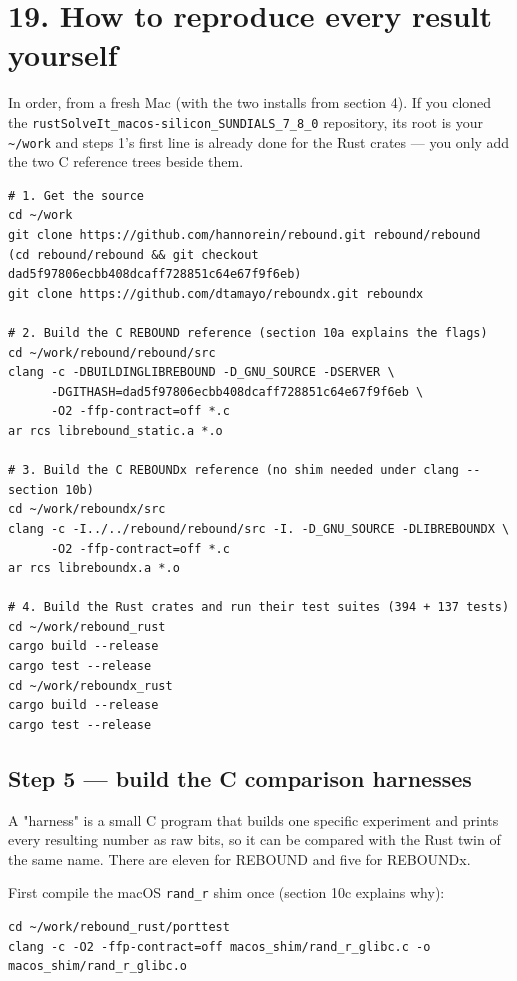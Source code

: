 \documentclass[11pt]{article}
\begin{document}
\section{19. How to reproduce every result yourself}

In order, from a fresh Mac (with the two installs from section 4). If you cloned the \texttt{rustSolveIt\_macos-silicon\_SUNDIALS\_7\_8\_0} repository, its root is your \texttt{\textasciitilde{}/work} and steps 1's first line is already done for the Rust crates --- you only add the two C reference trees beside them.

\begin{lstlisting}
# 1. Get the source
cd ~/work
git clone https://github.com/hannorein/rebound.git rebound/rebound
(cd rebound/rebound && git checkout dad5f97806ecbb408dcaff728851c64e67f9f6eb)
git clone https://github.com/dtamayo/reboundx.git reboundx

# 2. Build the C REBOUND reference (section 10a explains the flags)
cd ~/work/rebound/rebound/src
clang -c -DBUILDINGLIBREBOUND -D_GNU_SOURCE -DSERVER \
      -DGITHASH=dad5f97806ecbb408dcaff728851c64e67f9f6eb \
      -O2 -ffp-contract=off *.c
ar rcs librebound_static.a *.o

# 3. Build the C REBOUNDx reference (no shim needed under clang -- section 10b)
cd ~/work/reboundx/src
clang -c -I../../rebound/rebound/src -I. -D_GNU_SOURCE -DLIBREBOUNDX \
      -O2 -ffp-contract=off *.c
ar rcs libreboundx.a *.o

# 4. Build the Rust crates and run their test suites (394 + 137 tests)
cd ~/work/rebound_rust
cargo build --release
cargo test --release
cd ~/work/reboundx_rust
cargo build --release
cargo test --release
\end{lstlisting}

\subsection{Step 5 --- build the C comparison harnesses}

A "harness" is a small C program that builds one specific experiment and prints every resulting number as raw bits, so it can be compared with the Rust twin of the same name. There are eleven for REBOUND and five for REBOUNDx.

First compile the macOS \texttt{rand\_r} shim once (section 10c explains why):

\begin{lstlisting}
cd ~/work/rebound_rust/porttest
clang -c -O2 -ffp-contract=off macos_shim/rand_r_glibc.c -o macos_shim/rand_r_glibc.o
\end{lstlisting}
\end{document}
